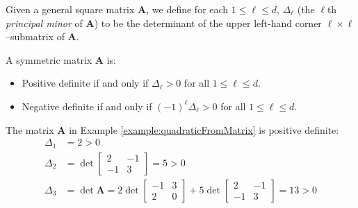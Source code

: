 \begin{theorem}\label{theorem:PrincipalMinors}
Given a general square matrix $\boldsymbol{A}$, we define for each $1\leq \ell \leq d$, $\Delta_\ell$ (the $\ell$th \emph{principal minor} of $\boldsymbol{A}$) to be the determinant of the upper left-hand corner $\ell \times \ell$--submatrix of $\boldsymbol{A}$.  
\begin{center}
\end{center}
A symmetric matrix $\boldsymbol{A}$ is:
\begin{itemize}
\item Positive definite if and only if $\Delta_\ell > 0$ for all $1\leq \ell \leq d$.
\item Negative definite if and only if $(-1)^\ell \Delta_\ell>0$ for all $1\leq \ell \leq d$.
\end{itemize}
\end{theorem}

\begin{example}
The matrix $\boldsymbol{A}$ in Example \ref{example:quadraticFromMatrix} is positive definite:
\begin{align*}
\Delta_1 &= 2 > 0 \\
\Delta_2 &= \det \begin{bmatrix} 2 & -1 \\ -1 & 3 \end{bmatrix} = 5 > 0 \\
\Delta_3 &= \det \boldsymbol{A} = 2 \det \begin{bmatrix} -1 & 3 \\ 2 & 0 \end{bmatrix} + 5 \det \begin{bmatrix} 2 & -1 \\ -1 & 3 \end{bmatrix} = 13 >0
\end{align*}
\end{example}

